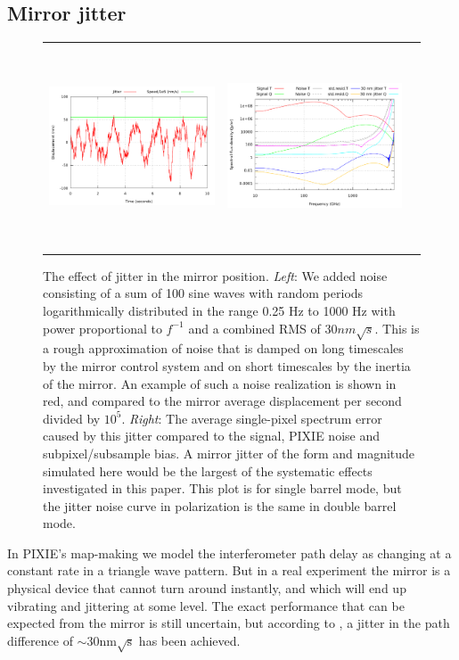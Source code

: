 \documentclass{article}
\begin{document}
\subsection{Mirror jitter}
\begin{figure}
	\centering
	\hspace*{-5mm}\begin{tabular}{ccc}
		\includegraphics[height=57mm,clip,trim=0 0 5mm 0]{plots/jit_wave_noise_realization_30nm.pdf} &
		\includegraphics[height=60mm,clip,trim=0 0 6mm 0]{plots/jitter_sb_30nm_abs_log_log.pdf}
	\end{tabular}
	\caption{The effect of jitter in the mirror position. \emph{Left}:
	We added noise consisting of a sum of 100 sine waves with random
	periods logarithmically distributed in the range 0.25 Hz to 1000 Hz
	with power proportional to $f^{-1}$ and a combined RMS of $30 nm\sqrt{s}$.
	This is a rough approximation of noise that is damped
	on long timescales by the mirror control system and on short timescales
	by the inertia of the mirror. An example of such a noise realization
	is shown in red,
	and compared to the mirror average displacement per second divided by $10^5$.
	\emph{Right}:
	The average single-pixel spectrum error caused by this jitter
	compared to the signal, PIXIE noise and subpixel/subsample bias.
	A mirror jitter of the form and magnitude simulated here would be
	the largest of the systematic effects investigated in this
	paper. This plot is for single barrel mode, but the jitter noise
	curve in polarization is the same in double barrel mode.}
	\label{fig:jitter}
\end{figure}
In PIXIE's map-making we model the interferometer path delay as
changing at a constant rate in a triangle wave pattern. But in a
real experiment the mirror is a physical device that cannot turn
around instantly, and which will end up vibrating and jittering
at some level. The exact performance that can be expected from
the mirror is still uncertain, but according to \citet{pixie-systematics},
a jitter in the path difference of $\sim 30 \textrm{nm}\sqrt{\textrm{s}}$ has been
achieved.
\end{document}
